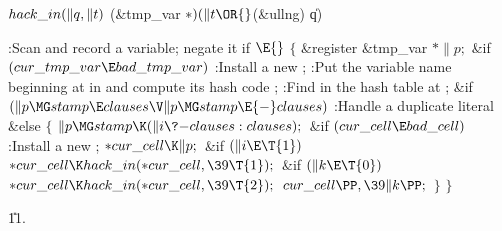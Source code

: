 \Y\B\4\D$\\{hack\_in}(\|q,\|t)$ \5
(\&{tmp\_var} ${}{*})(\|t\OR{}$(\&{ullng}) \|q)\par
\Y\B\4:Scan and record a variable; negate it if \X${}\E{}$%
\6
${}\{{}$\1\6
\&{register} \&{tmp\_var} ${}{*}\|p;{}$\7
\&{if} ${}(\\{cur\_tmp\_var}\E\\{bad\_tmp\_var}){}$\1\5
:Install a new \X;\2\6
:Put the variable name beginning at  in  and compute its hash code \X;\6
:Find  in the hash table at \X;\6
\&{if} ${}(\|p\MG\\{stamp}\E\\{clauses}\V\|p\MG\\{stamp}\E{-}\\{clauses}){}$\1\5
:Handle a duplicate literal\X\2\6
\&{else}\5
${}\{{}$\1\6
${}\|p\MG\\{stamp}\K(\|i\?{-}\\{clauses}:\\{clauses});{}$\6
\&{if} ${}(\\{cur\_cell}\E\\{bad\_cell}){}$\1\5
:Install a new \X;\2\6
${}{*}\\{cur\_cell}\K\|p;{}$\6
\&{if} ${}(\|i\E\T{1}){}$\1\5
${}{*}\\{cur\_cell}\K\\{hack\_in}({*}\\{cur\_cell},\39\T{1});{}$\2\6
\&{if} ${}(\|k\E\T{0}){}$\1\5
${}{*}\\{cur\_cell}\K\\{hack\_in}({*}\\{cur\_cell},\39\T{2});{}$\2\6
${}\\{cur\_cell}\PP,\39\|k\PP;{}$\6
\4${}\}{}$\2\6
\4${}\}{}$\2\par
\U11.\fi

